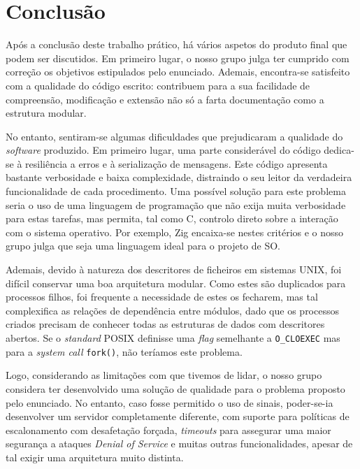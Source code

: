 \documentclass[11pt]{article}
\begin{document}
\section{Conclusão}

Após a conclusão deste trabalho prático, há vários aspetos do produto final que podem ser
discutidos. Em primeiro lugar, o nosso grupo julga ter cumprido com correção os objetivos
estipulados pelo enunciado. Ademais, encontra-se satisfeito com a qualidade do código escrito:
contribuem para a sua facilidade de compreensão, modificação e extensão não só a farta documentação
como a estrutura modular.

No entanto, sentiram-se algumas dificuldades que prejudicaram a qualidade do \emph{software}
produzido. Em primeiro lugar, uma parte considerável do código dedica-se à resiliência a erros e à
serialização de mensagens. Este código apresenta bastante verbosidade e baixa complexidade,
distraindo o seu leitor da verdadeira funcionalidade de cada procedimento. Uma possível solução para
este problema seria o uso de uma linguagem de programação que não exija muita verbosidade para estas
tarefas, mas permita, tal como C, controlo direto sobre a interação com o sistema operativo. Por
exemplo, Zig encaixa-se nestes critérios e o nosso grupo julga que seja uma linguagem ideal para o
projeto de SO.

Ademais, devido à natureza dos descritores de ficheiros em sistemas UNIX, foi difícil conservar uma
boa arquitetura modular. Como estes são duplicados para processos filhos, foi frequente a
necessidade de estes os fecharem, mas tal complexifica as relações de dependência entre módulos,
dado que os processos criados precisam de conhecer todas as estruturas de dados com descritores
abertos. Se o \emph{standard} POSIX definisse uma \emph{flag} semelhante a \texttt{O\_CLOEXEC} mas
para a \emph{system call} \texttt{fork()}, não teríamos este problema.

Logo, considerando as limitações com que tivemos de lidar, o nosso grupo considera ter desenvolvido
uma solução de qualidade para o problema proposto pelo enunciado. No entanto, caso fosse permitido o
uso de sinais, poder-se-ia desenvolver um servidor completamente diferente, com suporte para
políticas de escalonamento com desafetação forçada, \emph{timeouts} para assegurar uma maior
segurança a ataques \emph{Denial of Service} e muitas outras funcionalidades, apesar de tal exigir
uma arquitetura muito distinta.
\end{document}
